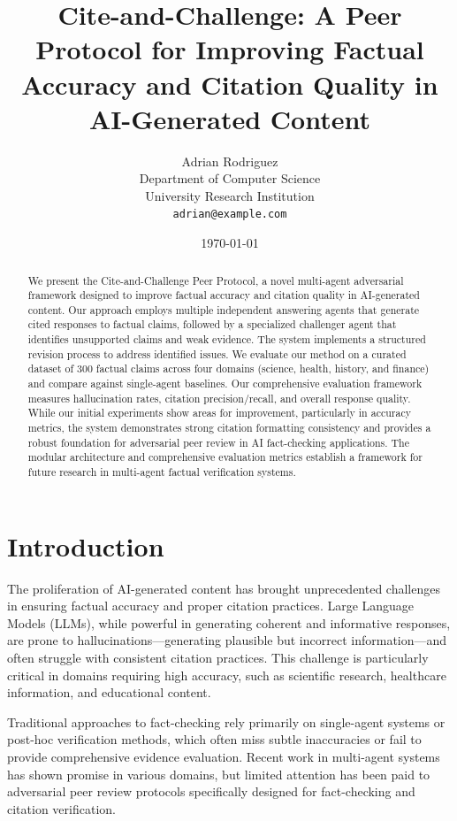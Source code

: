 \documentclass[11pt,a4paper]{article}
\title{\textbf{Cite-and-Challenge: A Peer Protocol for Improving Factual Accuracy and Citation Quality in AI-Generated Content}}
\author{Adrian Rodriguez\\
Department of Computer Science\\
University Research Institution\\
\texttt{adrian@example.com}}
\date{\today}
\begin{document}
\maketitle

\begin{abstract}
We present the Cite-and-Challenge Peer Protocol, a novel multi-agent adversarial framework designed to improve factual accuracy and citation quality in AI-generated content. Our approach employs multiple independent answering agents that generate cited responses to factual claims, followed by a specialized challenger agent that identifies unsupported claims and weak evidence. The system implements a structured revision process to address identified issues. We evaluate our method on a curated dataset of 300 factual claims across four domains (science, health, history, and finance) and compare against single-agent baselines. Our comprehensive evaluation framework measures hallucination rates, citation precision/recall, and overall response quality. While our initial experiments show areas for improvement, particularly in accuracy metrics, the system demonstrates strong citation formatting consistency and provides a robust foundation for adversarial peer review in AI fact-checking applications. The modular architecture and comprehensive evaluation metrics establish a framework for future research in multi-agent factual verification systems.
\end{abstract}

\section{Introduction}

The proliferation of AI-generated content has brought unprecedented challenges in ensuring factual accuracy and proper citation practices. Large Language Models (LLMs), while powerful in generating coherent and informative responses, are prone to hallucinations—generating plausible but incorrect information—and often struggle with consistent citation practices. This challenge is particularly critical in domains requiring high accuracy, such as scientific research, healthcare information, and educational content.

Traditional approaches to fact-checking rely primarily on single-agent systems or post-hoc verification methods, which often miss subtle inaccuracies or fail to provide comprehensive evidence evaluation. Recent work in multi-agent systems has shown promise in various domains, but limited attention has been paid to adversarial peer review protocols specifically designed for fact-checking and citation verification.
\end{document}
